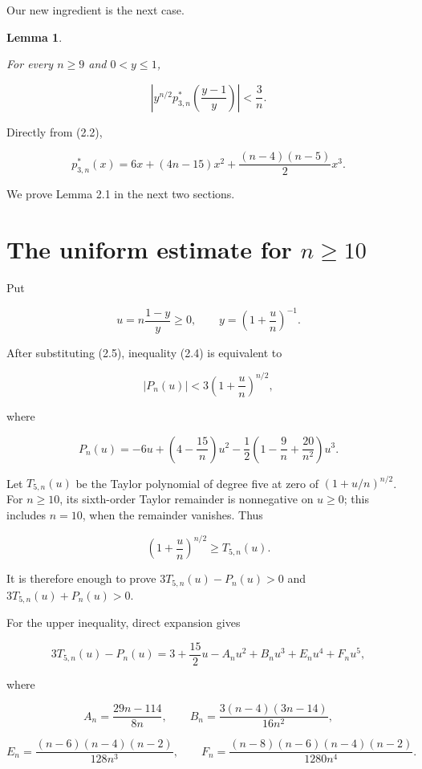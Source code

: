 \documentclass[11pt]{article}
\newtheorem{lemma}[theorem]{Lemma}
\begin{document}
Our new ingredient is the next case.

\Needspace{0.16\textheight}
\begin{lemma}
\label{lem:a3}

For every $n\ge9$ and $0<y\le1$,
\end{lemma}

\[
\left|y^{n/2}p^*_{3,n}\!\left(\frac{y-1}{y}\right)\right|<\frac3n.
                                                                        \tag{2.4}
\]

Directly from (2.2),

\[
p^*_{3,n}(x)
=6x+(4n-15)x^2+\frac{(n-4)(n-5)}2x^3.                                \tag{2.5}
\]

We prove Lemma 2.1 in the next two sections.

\section{The uniform estimate for \texorpdfstring{$n\ge10$}{n >= 10}}


Put

\[
u=n\frac{1-y}{y}\ge0,
\qquad y=\left(1+\frac un\right)^{-1}.
\]

After substituting (2.5), inequality (2.4) is equivalent to

\[
|P_n(u)|<3\left(1+\frac un\right)^{n/2},                              \tag{3.1}
\]

where

\[
P_n(u)=-6u+\left(4-\frac{15}{n}\right)u^2
-\frac12\left(1-\frac9n+\frac{20}{n^2}\right)u^3.                  \tag{3.2}
\]

Let $T_{5,n}(u)$ be the Taylor polynomial of degree five at zero of
$(1+u/n)^{n/2}$. For $n\ge10$, its sixth-order Taylor remainder is
nonnegative on $u\ge0$; this includes $n=10$, when the remainder vanishes.
Thus

\[
\left(1+\frac un\right)^{n/2}\ge T_{5,n}(u).                         \tag{3.3}
\]

It is therefore enough to prove
$3T_{5,n}(u)-P_n(u)>0$ and $3T_{5,n}(u)+P_n(u)>0$.

For the upper inequality, direct expansion gives

\[
3T_{5,n}(u)-P_n(u)
=3+\frac{15}{2}u-A_nu^2+B_nu^3+E_nu^4+F_nu^5,                       \tag{3.4}
\]

where

\[
A_n=\frac{29n-114}{8n},\qquad
B_n=\frac{3(n-4)(3n-14)}{16n^2},
\]

\[
E_n=\frac{(n-6)(n-4)(n-2)}{128n^3},\qquad
F_n=\frac{(n-8)(n-6)(n-4)(n-2)}{1280n^4}.
\]
\end{document}
